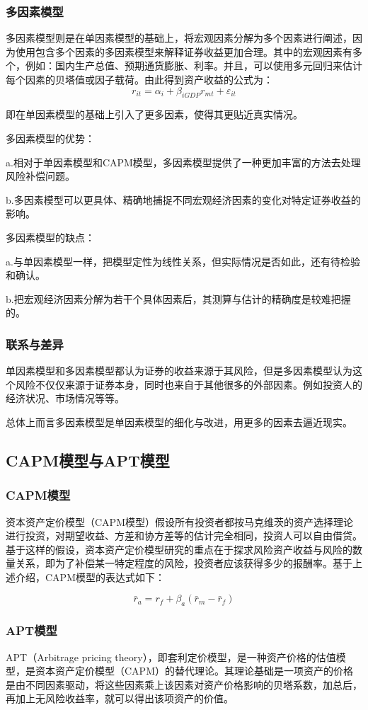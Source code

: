 \documentclass[UTF8]{ctexart}
\begin{document}
\subsubsection{多因素模型}
多因素模型则是在单因素模型的基础上，将宏观因素分解为多个因素进行阐述，因为使用包含多个因素的多因素模型来解释证券收益更加合理。其中的宏观因素有多个，例如：国内生产总值、预期通货膨胀、利率。并且，可以使用多元回归来估计每个因素的贝塔值或因子载荷。由此得到资产收益的公式为：
 $$r_{it} = \alpha_{i} + \beta_{iGDP}r_{mt} + \varepsilon _{it}$$\par
即在单因素模型的基础上引入了更多因素，使得其更贴近真实情况。\par
多因素模型的优势：\par
a.相对于单因素模型和CAPM模型，多因素模型提供了一种更加丰富的方法去处理风险补偿问题。\par
b.多因素模型可以更具体、精确地捕捉不同宏观经济因素的变化对特定证券收益的影响。\par
多因素模型的缺点：\par
a.与单因素模型一样，把模型定性为线性关系，但实际情况是否如此，还有待检验和确认。\par
b.把宏观经济因素分解为若干个具体因素后，其测算与估计的精确度是较难把握的。\par
\subsubsection{联系与差异}
单因素模型和多因素模型都认为证券的收益来源于其风险，但是多因素模型认为这个风险不仅仅来源于证券本身，同时也来自于其他很多的外部因素。例如投资人的经济状况、市场情况等等。\par
总体上而言多因素模型是单因素模型的细化与改进，用更多的因素去逼近现实。
\subsection{CAPM模型与APT模型}
\subsubsection{CAPM模型}
资本资产定价模型（CAPM模型）假设所有投资者都按马克维茨的资产选择理论进行投资，对期望收益、方差和协方差等的估计完全相同，投资人可以自由借贷。基于这样的假设，资本资产定价模型研究的重点在于探求风险资产收益与风险的数量关系，即为了补偿某一特定程度的风险，投资者应该获得多少的报酬率。基于上述介绍，CAPM模型的表达式如下：\par
$$\bar{r}_{a} = r_{f}+\beta_{a}(\bar{r}_{m}-\bar{r}_{f})$$
\subsubsection{APT模型}
APT（Arbitrage pricing theory），即套利定价模型，是一种资产价格的估值模型，是资本资产定价模型（CAPM）的替代理论。其理论基础是一项资产的价格是由不同因素驱动，将这些因素乘上该因素对资产价格影响的贝塔系数，加总后，再加上无风险收益率，就可以得出该项资产的价值。
\end{document}
